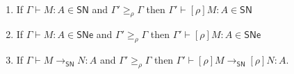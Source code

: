 \documentclass{article}
\newcommand{\ext}[1]{\geq_{#1}}
\newcommand{\SN}{\mathsf{SN}}
\newcommand{\SNe}{\mathsf{SNe}}
\newcommand{\redSN}{\longrightarrow_\SN}
\begin{document}
\begin{lemma}[Renaming]~\label{lm:renameSN}
  \begin{enumerate}
  \item If $\Gamma \vdash M : A \in \SN$ and $\Gamma' \ext{\rho} \Gamma$ then $\Gamma' \vdash [\rho]M : A \in \SN$
  \item If $\Gamma \vdash M : A \in \SNe$ and $\Gamma' \ext{\rho} \Gamma$ then $\Gamma' \vdash [\rho]M : A \in \SNe$
  \item If $\Gamma \vdash M \redSN N : A$ and $\Gamma' \ext{\rho} \Gamma$ then $\Gamma' \vdash [\rho]M \redSN [\rho]N : A$.
  \end{enumerate}
\end{lemma}
\end{document}
